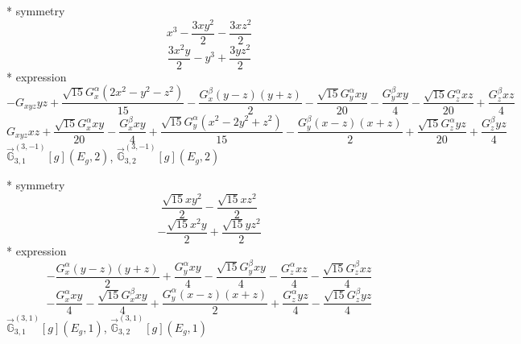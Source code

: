 \documentclass[fleqn,8pt]{jsarticle}
\begin{document}
\noindent\quad ** symmetry
\begin{dmath*}
x^{3} - \frac{3 x y^{2}}{2} - \frac{3 x z^{2}}{2}
\end{dmath*}
\begin{dmath*}
\frac{3 x^{2} y}{2} - y^{3} + \frac{3 y z^{2}}{2}
\end{dmath*}
\noindent\quad ** expression
\begin{dmath*}
- G_{xyz} y z + \frac{\sqrt{15} G_{x}^{\alpha} \left(2 x^{2} - y^{2} - z^{2}\right)}{15} - \frac{G_{x}^{\beta} \left(y - z\right) \left(y + z\right)}{2} - \frac{\sqrt{15} G_{y}^{\alpha} x y}{20} - \frac{G_{y}^{\beta} x y}{4} - \frac{\sqrt{15} G_{z}^{\alpha} x z}{20} + \frac{G_{z}^{\beta} x z}{4}
\end{dmath*}
\begin{dmath*}
G_{xyz} x z + \frac{\sqrt{15} G_{x}^{\alpha} x y}{20} - \frac{G_{x}^{\beta} x y}{4} + \frac{\sqrt{15} G_{y}^{\alpha} \left(x^{2} - 2 y^{2} + z^{2}\right)}{15} - \frac{G_{y}^{\beta} \left(x - z\right) \left(x + z\right)}{2} + \frac{\sqrt{15} G_{z}^{\alpha} y z}{20} + \frac{G_{z}^{\beta} y z}{4}
\end{dmath*}
\noindent\quad $\vec{\mathbb{G}}_{3,1}^{(3,-1)}[g](E_{g},2)$, $\vec{\mathbb{G}}_{3,2}^{(3,-1)}[g](E_{g},2)$

\noindent\quad ** symmetry
\begin{dmath*}
\frac{\sqrt{15} x y^{2}}{2} - \frac{\sqrt{15} x z^{2}}{2}
\end{dmath*}
\begin{dmath*}
- \frac{\sqrt{15} x^{2} y}{2} + \frac{\sqrt{15} y z^{2}}{2}
\end{dmath*}
\noindent\quad ** expression
\begin{dmath*}
- \frac{G_{x}^{\alpha} \left(y - z\right) \left(y + z\right)}{2} + \frac{G_{y}^{\alpha} x y}{4} - \frac{\sqrt{15} G_{y}^{\beta} x y}{4} - \frac{G_{z}^{\alpha} x z}{4} - \frac{\sqrt{15} G_{z}^{\beta} x z}{4}
\end{dmath*}
\begin{dmath*}
- \frac{G_{x}^{\alpha} x y}{4} - \frac{\sqrt{15} G_{x}^{\beta} x y}{4} + \frac{G_{y}^{\alpha} \left(x - z\right) \left(x + z\right)}{2} + \frac{G_{z}^{\alpha} y z}{4} - \frac{\sqrt{15} G_{z}^{\beta} y z}{4}
\end{dmath*}
\noindent\quad $\vec{\mathbb{G}}_{3,1}^{(3,1)}[g](E_{g},1)$, $\vec{\mathbb{G}}_{3,2}^{(3,1)}[g](E_{g},1)$
\end{document}
